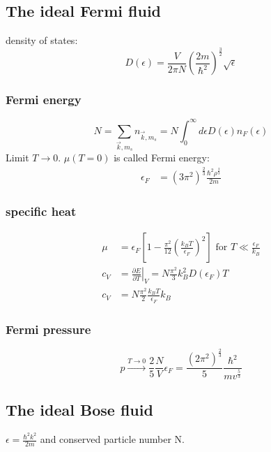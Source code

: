 \subsection*{The ideal Fermi fluid}
density of states:
\[
    D(\epsilon) = \frac{V}{2\pi N} \left(\frac{2m}{\hbar^2}\right)^{\frac{3}{2}} \sqrt{\epsilon}
\]

\subsubsection*{Fermi energy}
\[
    N = \sum_{\vec{k},m_s} n_{\vec{k},m_s} = N \int_0^\infty d\epsilon D(\epsilon) n_F(\epsilon)
\]
Limit $T \rightarrow 0$. $\mu(T=0)$ is called Fermi energy:
\[
    \begin{aligned}
        \epsilon_F &= (3\pi^2)^{\frac{2}{3}} \frac{\hbar^2 \rho^{\frac{2}{3}}}{2m}
    \end{aligned}
\]

\subsubsection*{specific heat}
\[
    \begin{aligned}
        \mu &= \epsilon_F \left[1-\frac{\pi^2}{12} \left(\frac{k_B T}{\epsilon_F}\right)^2\right] \text{ for } T \ll \frac{\epsilon_F}{k_B} \\
        c_V &= \left. \frac{\partial E}{\partial T} \right|_V = N \frac{\pi^2}{3} k_B^2 D(\epsilon_F)T \\
        c_V &= N \frac{\pi^2}{2} \frac{k_B T}{\epsilon_F} k_B
    \end{aligned}
\]

\subsubsection*{Fermi pressure}

\[
    p \overset{T\rightarrow 0}{\rightarrow}\frac{2}{5} \frac{N}{V}\epsilon_F = \frac{(2\pi^2)^{\frac{2}{3}}}{5} \frac{\hbar^2}{mv^{\frac{5}{3}}}
\]

\subsection*{The ideal Bose fluid}
$\epsilon = \frac{\hbar^2 k^2}{2m}$ and conserved particle number N.

